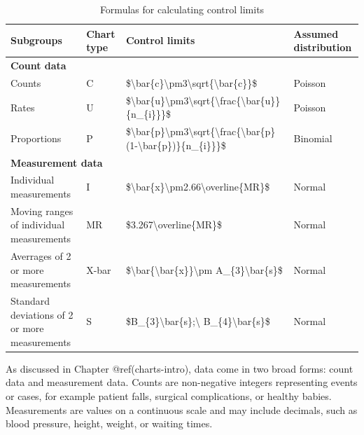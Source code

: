 \documentclass[
]{book}
\begin{document}
\begin{table}

\caption{\label{tab:limits-tab1}Formulas for calculating control limits}
\centering
\begin{tabular}[t]{l|l|l|l}
\hline
Subgroups & Chart type & Control limits & Assumed distribution\\
\hline
\multicolumn{4}{l}{\textbf{Count data}}\\
\hline
\hspace{1em}Counts & C & \$\textbackslash{}bar\{c\}\textbackslash{}pm3\textbackslash{}sqrt\{\textbackslash{}bar\{c\}\}\$ & Poisson\\
\hline
\hspace{1em}Rates & U & \$\textbackslash{}bar\{u\}\textbackslash{}pm3\textbackslash{}sqrt\{\textbackslash{}frac\{\textbackslash{}bar\{u\}\}\{n\_\{i\}\}\}\$ & Poisson\\
\hline
\hspace{1em}Proportions & P & \$\textbackslash{}bar\{p\}\textbackslash{}pm3\textbackslash{}sqrt\{\textbackslash{}frac\{\textbackslash{}bar\{p\}(1-\textbackslash{}bar\{p\})\}\{n\_\{i\}\}\}\$ & Binomial\\
\hline
\multicolumn{4}{l}{\textbf{Measurement data}}\\
\hline
\hspace{1em}Individual measurements & I & \$\textbackslash{}bar\{x\}\textbackslash{}pm2.66\textbackslash{}overline\{MR\}\$ & Normal\\
\hline
\hspace{1em}Moving ranges of individual measurements & MR & \$3.267\textbackslash{}overline\{MR\}\$ & Normal\\
\hline
\hspace{1em}Averrages of 2 or more measurements & X-bar & \$\textbackslash{}bar\{\textbackslash{}bar\{x\}\}\textbackslash{}pm A\_\{3\}\textbackslash{}bar\{s\}\$ & Normal\\
\hline
\hspace{1em}Standard deviations of 2 or more measurements & S & \$B\_\{3\}\textbackslash{}bar\{s\};\textbackslash{} B\_\{4\}\textbackslash{}bar\{s\}\$ & Normal\\
\hline
\end{tabular}
\end{table}

As discussed in Chapter @ref(charts-intro), data come in two broad
forms: count data and measurement data. Counts are non-negative integers
representing events or cases, for example patient falls, surgical
complications, or healthy babies. Measurements are values on a
continuous scale and may include decimals, such as blood pressure,
height, weight, or waiting times.
\end{document}
